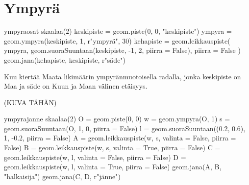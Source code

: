 \section*{Ympyrä}

\begin{luoKuva}{ympyraosat}
	skaalaa(2)
	keskipiste = geom.piste(0, 0, "keskipiste")
	ympyra = geom.ympyra(keskipiste, 1, r"ympyr\"{a}", 30)
	kehapiste = geom.leikkauspiste(
		ympyra, geom.suoraSuuntaan(keskipiste, -1, 2, piirra = False), piirra = False
	)
	geom.jana(kehapiste, keskipiste, r"s\"{a}de")
\end{luoKuva}
\begin{center}
\end{center}

\begin{esimerkki}
Kuu kiertää Maata likimäärin ympyränmuotoisella radalla, jonka keskipiste on Maa ja säde on Kuun ja Maan välinen etäisyys.
\end{esimerkki}

(KUVA TÄHÄN)

\begin{luoKuva}{ympyrajanne}
	skaalaa(2)
	O = geom.piste(0, 0)
	w = geom.ympyra(O, 1)
	s = geom.suoraSuuntaan(O, 1, 0, piirra = False)
	l = geom.suoraSuuntaan((0.2, 0.6), 1, -0.2, piirra = False)
	A = geom.leikkauspiste(w, s, valinta = False, piirra = False)
	B = geom.leikkauspiste(w, s, valinta = True, piirra = False)
	C = geom.leikkauspiste(w, l, valinta = False, piirra = False)
	D = geom.leikkauspiste(w, l, valinta = True, piirra = False)
	geom.jana(A, B, "halkaisija")
	geom.jana(C, D, r"j\"{a}nne")
\end{luoKuva}
\begin{center}
\end{center}


